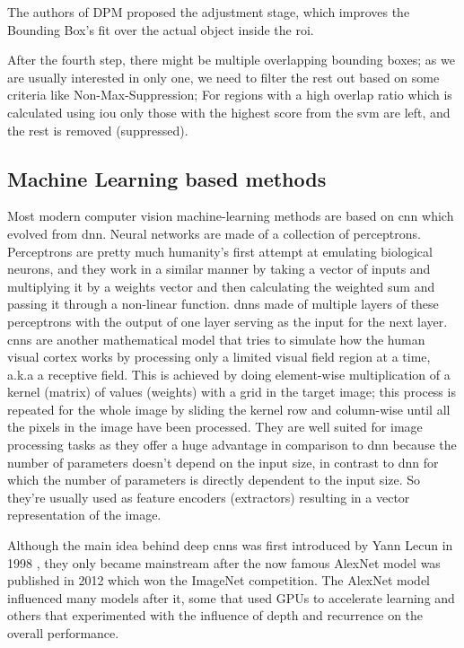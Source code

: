 The authors of DPM proposed the adjustment stage, which improves the Bounding Box's fit over the actual object inside the \gls{roi}.

After the fourth step, there might be multiple overlapping bounding boxes; as we are usually interested in only one, we need to filter the rest out based on some criteria like Non-Max-Suppression; For regions with a high overlap ratio which is calculated using \gls{iou} only those with the highest score from the \gls{svm} are left, and the rest is removed (suppressed).

\subsection{Machine Learning based methods}
Most modern computer vision machine-learning methods are based on \gls{cnn} which evolved from \gls{dnn}. Neural networks are made of a collection of perceptrons. Perceptrons are pretty much humanity's first attempt at emulating biological neurons, and they work in a similar manner by taking a vector of inputs and multiplying it by a weights vector and then calculating the weighted sum and passing it through a non-linear function. \gls{dnn}s made of multiple layers of these perceptrons with the output of one layer serving as the input for the next layer. \gls{cnn}s are another mathematical model that tries to simulate how the human visual cortex works by processing only a limited visual field region at a time, a.k.a a receptive field. This is achieved by doing element-wise multiplication of a kernel (matrix) of values (weights) with a grid in the target image; this process is repeated for the whole image by sliding the kernel row and column-wise until all the pixels in the image have been processed. They are well suited for image processing tasks as they offer a huge advantage in comparison to \gls{dnn} because the number of parameters doesn't depend on the input size, in contrast to \gls{dnn} for which the number of parameters is directly dependent to the input size. So they're usually used as feature encoders (extractors) resulting in a vector representation of the image.

 Although the main idea behind deep \gls{cnn}s was first introduced by Yann Lecun in 1998 \cite{lecun_gradient-based_1998}, they only became mainstream after the now famous AlexNet model was published in 2012 \cite{krizhevsky_imagenet_2012} which won the ImageNet competition. The AlexNet model influenced many models after it, some that used GPUs to accelerate learning and others that experimented with the influence of depth and recurrence on the overall performance.

